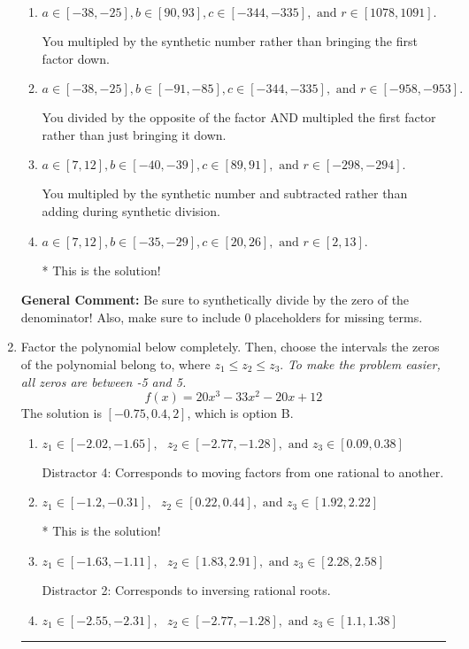 \documentclass{extbook}[14pt]
\newcommand{\litem}[1]{\item #1

\rule{\textwidth}{0.4pt}}
\begin{document}
\begin{enumerate}
{\begin{enumerate}[label=\Alph*.]
 You divided by the opposite of the factor.
\item \( a \in [-38, -25], b \in [90, 93], c \in [-344, -335], \text{ and } r \in [1078, 1091]. \)

 You multipled by the synthetic number rather than bringing the first factor down.
\item \( a \in [-38, -25], b \in [-91, -85], c \in [-344, -335], \text{ and } r \in [-958, -953]. \)

 You divided by the opposite of the factor AND multipled the first factor rather than just bringing it down.
\item \( a \in [7, 12], b \in [-40, -39], c \in [89, 91], \text{ and } r \in [-298, -294]. \)

 You multipled by the synthetic number and subtracted rather than adding during synthetic division.
\item \( a \in [7, 12], b \in [-35, -29], c \in [20, 26], \text{ and } r \in [2, 13]. \)

* This is the solution!
\end{enumerate}

\textbf{General Comment:} Be sure to synthetically divide by the zero of the denominator! Also, make sure to include 0 placeholders for missing terms.
}
\litem{
Factor the polynomial below completely. Then, choose the intervals the zeros of the polynomial belong to, where $z_1 \leq z_2 \leq z_3$. \textit{To make the problem easier, all zeros are between -5 and 5.}
\[ f(x) = 20x^{3} -33 x^{2} -20 x + 12 \]The solution is \( [-0.75, 0.4, 2] \), which is option B.\begin{enumerate}[label=\Alph*.]
\item \( z_1 \in [-2.02, -1.65], \text{   }  z_2 \in [-2.77, -1.28], \text{   and   } z_3 \in [0.09, 0.38] \)

 Distractor 4: Corresponds to moving factors from one rational to another.
\item \( z_1 \in [-1.2, -0.31], \text{   }  z_2 \in [0.22, 0.44], \text{   and   } z_3 \in [1.92, 2.22] \)

* This is the solution!
\item \( z_1 \in [-1.63, -1.11], \text{   }  z_2 \in [1.83, 2.91], \text{   and   } z_3 \in [2.28, 2.58] \)

 Distractor 2: Corresponds to inversing rational roots.
\item \( z_1 \in [-2.55, -2.31], \text{   }  z_2 \in [-2.77, -1.28], \text{   and   } z_3 \in [1.1, 1.38] \)


\end{enumerate}}
\end{enumerate}
\end{document}
